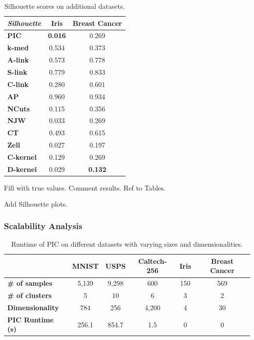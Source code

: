 \begin{table}[h]
    \centering
    \begin{tabular}{|l|c|c|}
    \hline
    \textit{Silhouette} & \textbf{Iris} & \textbf{Breast Cancer} \\
    \hline
    \textbf{PIC}       & \textbf{0.016} & 0.269 \\ \hline
    \textbf{k-med}     & 0.534 & 0.373 \\ \hline
    \textbf{A-link}    & 0.573 & 0.778 \\ \hline
    \textbf{S-link}    & 0.779 & 0.833 \\ \hline
    \textbf{C-link}    & 0.280 & 0.601 \\ \hline
    \textbf{AP}        & 0.960 & 0.934 \\ \hline
    \textbf{NCuts}     & 0.115 & 0.356 \\ \hline
    \textbf{NJW}       & 0.033 & 0.269 \\ \hline
    \textbf{CT}        & 0.493 & 0.615 \\ \hline
    \textbf{Zell}      & 0.027 & 0.197 \\ \hline
    \textbf{C-kernel}  & 0.129 & 0.269 \\ \hline
    \textbf{D-kernel}  & 0.029 & \textbf{0.132} \\
    \hline
    \end{tabular}
    \caption{Silhouette scores on additional datasets.}
    \label{table:silhouette_additional}
\end{table}

Fill with true values. Comment results. Ref to Tables.

Add Silhouette plots.

\subsubsection{Scalability Analysis}

\begin{table}[h]
    \centering
    \begin{tabular}{|l|c|c|c|c|c|}
    \hline
     & \textbf{MNIST} & \textbf{USPS} & \textbf{Caltech-256} & \textbf{Iris} & \textbf{Breast Cancer} \\
    \hline
    \textbf{\# of samples} & 5,139 & 9,298 & 600 & 150 & 569 \\ \hline
    \textbf{\# of clusters} & 5 & 10 & 6 & 3 & 2 \\ \hline
    \textbf{Dimensionality} & 784 & 256 & 4,200 & 4 & 30 \\ \hline
    \textbf{PIC Runtime (s)} & 256.1 & 854.7 & 1.5 & 0 & 0 \\ \hline
    \end{tabular}
    \caption{Runtime of PIC on different datasets with varying sizes and dimensionalities.}
    \label{table:time}
\end{table}

